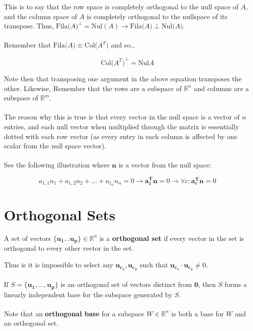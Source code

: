 \documentclass[12pt]{article}
\newcommand{\R}{\mathbb{R}}
\newcommand{\bt}[1]{\textbf{{#1}}}
\newcommand{\bm}[1]{\mathbf{{#1}}}
\newcommand{\set}[1]{\{{#1}\}}
\begin{document}
This is to say that the row space is completely orthogonal to the null space of $A$, and the column space of $A$ is completely orthogonal
to the nullspace of its transpose. Thus, $\textrm{Fila($A$)}^\perp = \textrm{Nul$(A)$} \rightarrow \textrm{Fila($A$)} \perp \textrm{Nul($A$)}$. \\ \\

Remember that $\textrm{Fila($A$)} \equiv \textrm{Col($A^T$)}$ and so\dots

$$\textrm{Col($A^T$)}^\perp = \textrm{Nul$A$}$$

Note then that transposing one argument in the above equation transposes the other. Likewise, Remember
that the rows are a subspace of $\R^n$ and columns are a subspace of $\R^m$. \\ \\

The reason why this is true is that every vector in the null space is a vector of $n$ entries, and each null vector
when multiplied through the matrix is essentially dotted with each row vector (as every entry in each column is affected by one scalar from the null space vector). \\ \\

See the following illustration where $\bm{n}$ is a vector from the null space:

$$a_{1,1}n_1 + a_{1,2}n_2 + \dots + a_{1_n}n_n = 0 \rightarrow \bm{a_1^T}\bm{n} = 0 \rightarrow \forall c: \bm{a_c^T}\bm{n} = 0$$

\section*{Orthogonal Sets}

A set of vectors $\bm{\set{u_1 \dots u_p}} \in \R^n$ is a \bt{orthogonal set}
if every vector in the set is orthogonal to every other vector in the set.

Thus is it is impossible to select any $\bm{u_{c_1}, u_{c_2}}$ such that $\bm{u_{c_1} \cdot u_{c_2}} \neq 0$. \\ \\

If $S = \set{\bm{u_1, \dots, u_p}}$ is an orthogonal set of vectors distinct from $\bm{0}$, then
$S$ forms a linearly independent base for the subspace generated by $S$. \\ \\

Note that an \bt{orthogonal base} for a subspace $W \in \R^n$ is both a base for $W$ and an orthogonal set. \\ \\
\end{document}
